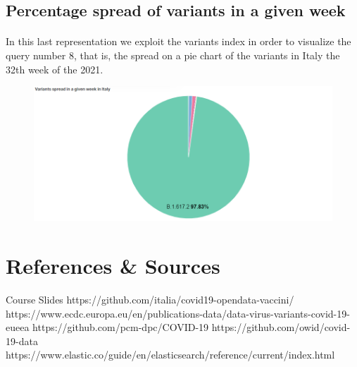\documentclass[a4paper,12pt]{article}
\begin{document}
\subsection{Percentage spread of variants in a given week}
\paragraph{}In this last representation we exploit the variants index in order to visualize the query number 8, that is, the spread on a pie chart of the variants in Italy the 32th week of the 2021.
\begin{figure}[h]
	\centering
  \includegraphics[width=\linewidth]{dashboards/dash10.png}
\end{figure}
\newpage

\section{References \& Sources}
  \begin{thebibliography}{9}
    \bibitem{} Course Slides
    \bibitem{} https://github.com/italia/covid19-opendata-vaccini/
    \bibitem{} https://www.ecdc.europa.eu/en/publications-data/data-virus-variants-covid-19-eueea
    \bibitem{} https://github.com/pcm-dpc/COVID-19
    \bibitem{} https://github.com/owid/covid-19-data
    \bibitem{} https://www.elastic.co/guide/en/elasticsearch/reference/current/index.html
  \end{thebibliography}
\end{document}
